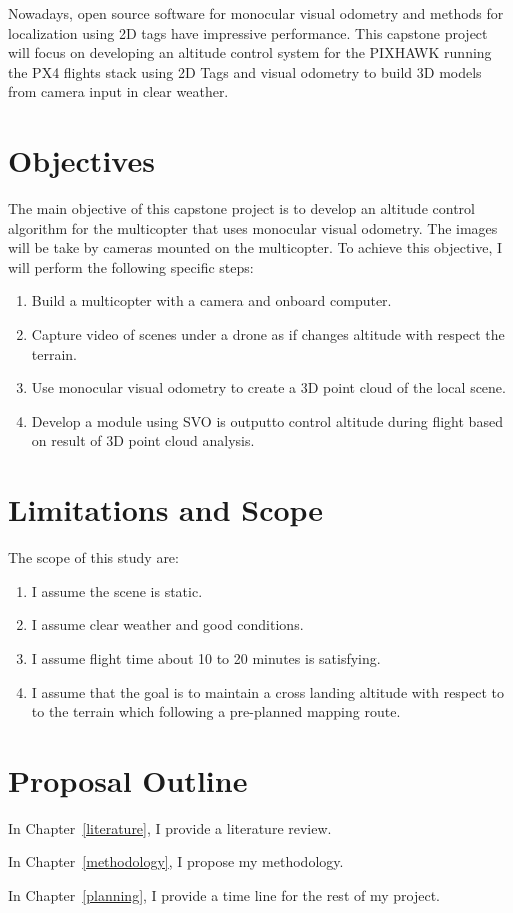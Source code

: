 \documentclass[12pt, a4paper]{aitthesis}
\begin{document}
Nowadays, open source software for monocular visual odometry and methods for localization using 2D tags have impressive performance. This capstone project will focus on developing an altitude control system for the PIXHAWK running the PX4 flights stack using 2D Tags and visual odometry to build 3D models from camera input in clear weather.


\section{Objectives}
The main objective of this capstone project is to develop an altitude control algorithm for the multicopter that uses monocular visual odometry. The images will be take by cameras mounted on the multicopter. To achieve this objective, I will perform the following specific steps:
\begin{enumerate}
	\item Build a multicopter with a camera and onboard computer.
	\item Capture video of scenes under a drone as if changes altitude with respect the terrain. 
	\item Use monocular visual odometry to create a 3D point cloud of the local scene.
	\item Develop a module using SVO is outputto control altitude during flight based on result of 3D point cloud analysis. 
\end{enumerate}

\section{Limitations and Scope}
The scope of this study are:
\begin{enumerate}
	\item I assume the scene is static.
	\item I assume clear weather and good conditions.
	\item I assume flight time about 10 to 20 minutes is satisfying.
	\item I assume that the goal is to maintain a cross landing altitude with respect to to the terrain which following a pre-planned mapping route.
\end{enumerate}

\section{Proposal Outline}
\begin{description}
	\item In Chapter~\ref{literature}, I provide a literature review. 
	\item In Chapter~\ref{methodology}, I propose my methodology.
	\item In Chapter~\ref{planning}, I provide a time line for the rest of my project.
\end{description}
\end{document}
